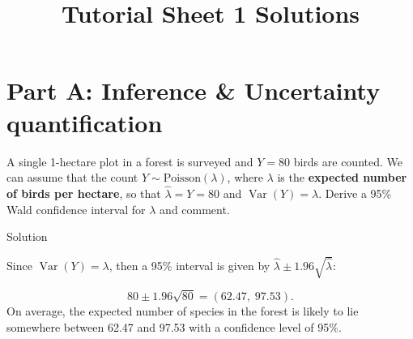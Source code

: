 \documentclass[
  letterpaper,
  DIV=11,
  numbers=noendperiod,
  oneside]{scrartcl}
\title{Tutorial Sheet 1 Solutions}
\author{}
\date{}
\makeatletter
\renewcommand{\maketitle}{\bgroup\setlength{\parindent}{0pt}
\begin{flushleft}
  {\color{uniblue}\sffamily\huge\textbf{\@title}} \vspace{0.3cm} \newline
  {\Large {\@subtitle}} \newline
  \@author
\end{flushleft}\egroup
}
\makeatother
\begin{document}
\maketitle

\pagestyle{mystyle}


\section{Part A: Inference \& Uncertainty
quantification}\label{part-a-inference-uncertainty-quantification}

\begin{tcolorbox}[enhanced jigsaw, bottomrule=.15mm, breakable, bottomtitle=1mm, colback=white, titlerule=0mm, colbacktitle=quarto-callout-tip-color!10!white, rightrule=.15mm, toptitle=1mm, left=2mm, opacityback=0, toprule=.15mm, arc=.35mm, title={Task 1}, colframe=quarto-callout-tip-color-frame, coltitle=black, leftrule=.75mm, opacitybacktitle=0.6]

A single 1-hectare plot in a forest is surveyed and \(Y = 80\) birds are
counted. We can assume that the count
\(Y \sim \text{Poisson}(\lambda)\), where \(\lambda\) is the
\textbf{expected number of birds per hectare}, so that
\(\hat\lambda = Y = 80\) and \(\operatorname{Var}(Y) = \lambda\). Derive
a 95\% Wald confidence interval for \(\lambda\) and comment.

Solution

Since \(\operatorname{Var}(Y) = \lambda\), then a 95\% interval is given
by \(\hat\lambda \pm 1.96\sqrt{\hat\lambda}\):

\[
80 \pm 1.96\sqrt{80} =  (62.47,\;97.53).
\] On average, the expected number of species in the forest is likely to
lie somewhere between 62.47 and 97.53 with a confidence level of 95\%.

\end{tcolorbox}
\end{document}
